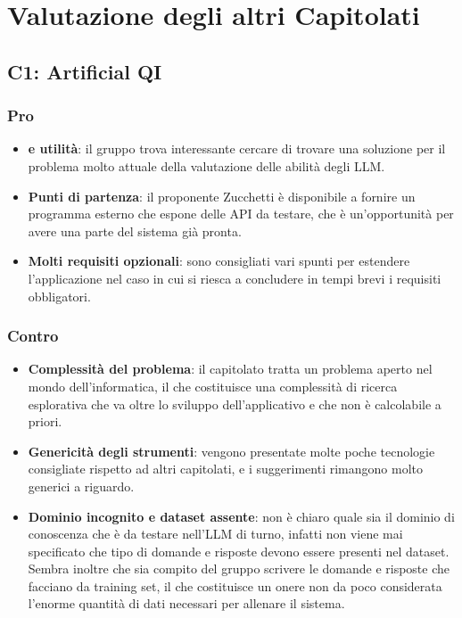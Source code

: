 \section{Valutazione degli altri Capitolati}


\subsection{C1: Artificial QI}

\subsubsection{Pro}

\begin{itemize}
    \item \textbf{ e utilità}: il gruppo trova interessante cercare di trovare una soluzione per il problema molto attuale della valutazione delle abilità degli LLM.
    \item \textbf{Punti di partenza}: il proponente Zucchetti è disponibile a fornire un programma esterno che espone delle API da testare, che è un'opportunità per avere una parte del sistema già pronta.
    \item \textbf{Molti requisiti opzionali}: sono consigliati vari spunti per estendere l'applicazione nel caso in cui si riesca a concludere in tempi brevi i requisiti obbligatori.
\end{itemize}

\subsubsection{Contro}

\begin{itemize}
    \item \textbf{Complessità del problema}: il capitolato tratta un problema aperto nel mondo dell'informatica, il che costituisce una complessità di ricerca esplorativa che va oltre lo sviluppo dell'applicativo e che non è calcolabile a priori.
    \item \textbf{Genericità degli strumenti}: vengono presentate molte poche tecnologie consigliate rispetto ad altri capitolati, e i suggerimenti rimangono molto generici a riguardo.
    \item \textbf{Dominio incognito e dataset assente}: non è chiaro quale sia il dominio di conoscenza che è da testare nell'LLM di turno, infatti non viene mai specificato che tipo di domande e risposte devono essere presenti nel dataset. Sembra inoltre che sia compito del gruppo scrivere le domande e risposte che facciano da training set, il che costituisce un onere non da poco considerata l'enorme quantità di dati necessari per allenare il sistema.
\end{itemize}


